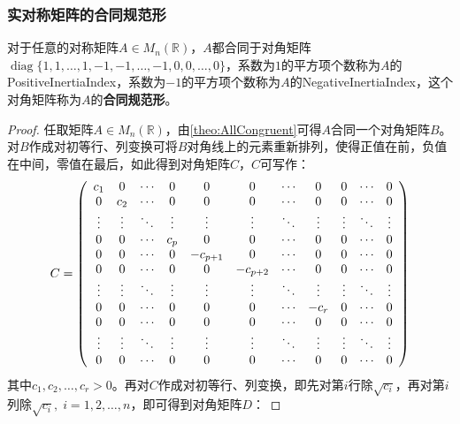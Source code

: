 \subsubsection{实对称矩阵的合同规范形}
\begin{theorem}\label{theo:Congruent1-10}
	对于任意的对称矩阵$A\in M_{n}(\mathbb{R})$，$A$都合同于对角矩阵\\$\operatorname{diag}\{1,1,\dots,1,-1,-1,\dots,-1,0,0,\dots,0\}$，系数为$1$的平方项个数称为$A$的\gls{PositiveInertiaIndex}，系数为$-1$的平方项个数称为$A$的\gls{NegativeInertiaIndex}，这个对角矩阵称为$A$的\textbf{合同规范形}。
\end{theorem}
\begin{proof}
	任取矩阵$A\in M_{n}(\mathbb{R})$，由\cref{theo:AllCongruent}可得$A$合同一个对角矩阵$B$。对$B$作成对初等行、列变换可将$B$对角线上的元素重新排列，使得正值在前，负值在中间，零值在最后，如此得到对角矩阵$C$，$C$可写作：
	\begin{equation*}
		C=
		\left(
		\begin{array}{*{11}c}
			c_1 & 0 & \cdots & 0 & 0 & 0 & \cdots & 0 & 0 & \cdots & 0 \\
			0 & c_2 & \cdots & 0 & 0 & 0 & \cdots & 0 & 0 & \cdots & 0 \\
			\vdots & \vdots & \ddots & \vdots & \vdots & \vdots & \ddots & \vdots & \vdots & \ddots & \vdots \\
			0 & 0 & \cdots & c_p & 0 & 0 & \cdots & 0 & 0 & \cdots & 0 \\
			0 & 0 & \cdots & 0 & -c_{p+1} & 0 & \cdots & 0 & 0 & \cdots & 0 \\
			0 & 0 & \cdots & 0 & 0 & -c_{p+2} & \cdots & 0 & 0 & \cdots & 0 \\
			\vdots & \vdots & \ddots & \vdots & \vdots & \vdots & \ddots & \vdots & \vdots & \ddots & \vdots \\
			0 & 0 & \cdots & 0 & 0 & 0 & \cdots & -c_r & 0 & \cdots & 0 \\
			0 & 0 & \cdots & 0 & 0 & 0 & \cdots & 0 & 0 & \cdots & 0 \\
			\vdots & \vdots & \ddots & \vdots & \vdots & \vdots & \ddots & \vdots & \vdots & \ddots & \vdots \\
			0 & 0 & \cdots & 0 & 0 & 0 & \cdots & 0 & 0 & \cdots & 0 \\
		\end{array}
		\right)
	\end{equation*}
	其中$c_1,c_2,\dots,c_r>0$。再对$C$作成对初等行、列变换，即先对第$i$行除$\sqrt{c_i}$，再对第$i$列除$\sqrt{c_i},\;i=1,2,\dots,n$，即可得到对角矩阵$D$：

\end{proof}
